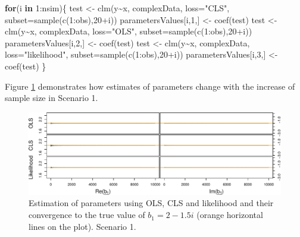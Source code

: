 \documentclass[
]{book}
\newenvironment{Shaded}{\begin{snugshade}}{\end{snugshade}}
\newcommand{\AttributeTok}[1]{\textcolor[rgb]{0.77,0.63,0.00}{#1}}
\newcommand{\ControlFlowTok}[1]{\textcolor[rgb]{0.13,0.29,0.53}{\textbf{#1}}}
\newcommand{\DecValTok}[1]{\textcolor[rgb]{0.00,0.00,0.81}{#1}}
\newcommand{\FunctionTok}[1]{\textcolor[rgb]{0.00,0.00,0.00}{#1}}
\newcommand{\NormalTok}[1]{#1}
\newcommand{\OtherTok}[1]{\textcolor[rgb]{0.56,0.35,0.01}{#1}}
\newcommand{\SpecialCharTok}[1]{\textcolor[rgb]{0.00,0.00,0.00}{#1}}
\newcommand{\StringTok}[1]{\textcolor[rgb]{0.31,0.60,0.02}{#1}}
\begin{document}
\begin{Shaded}
\begin{Highlighting}[]
\ControlFlowTok{for}\NormalTok{(i }\ControlFlowTok{in} \DecValTok{1}\SpecialCharTok{:}\NormalTok{nsim)\{}
\NormalTok{    test }\OtherTok{\textless{}{-}} \FunctionTok{clm}\NormalTok{(y}\SpecialCharTok{\textasciitilde{}}\NormalTok{x, complexData, }\AttributeTok{loss=}\StringTok{"CLS"}\NormalTok{,}
                \AttributeTok{subset=}\FunctionTok{sample}\NormalTok{(}\FunctionTok{c}\NormalTok{(}\DecValTok{1}\SpecialCharTok{:}\NormalTok{obs),}\DecValTok{20}\SpecialCharTok{+}\NormalTok{i))}
\NormalTok{    parametersValues[i,}\DecValTok{1}\NormalTok{,] }\OtherTok{\textless{}{-}} \FunctionTok{coef}\NormalTok{(test)}
\NormalTok{    test }\OtherTok{\textless{}{-}} \FunctionTok{clm}\NormalTok{(y}\SpecialCharTok{\textasciitilde{}}\NormalTok{x, complexData, }\AttributeTok{loss=}\StringTok{"OLS"}\NormalTok{,}
                \AttributeTok{subset=}\FunctionTok{sample}\NormalTok{(}\FunctionTok{c}\NormalTok{(}\DecValTok{1}\SpecialCharTok{:}\NormalTok{obs),}\DecValTok{20}\SpecialCharTok{+}\NormalTok{i))}
\NormalTok{    parametersValues[i,}\DecValTok{2}\NormalTok{,] }\OtherTok{\textless{}{-}} \FunctionTok{coef}\NormalTok{(test)}
\NormalTok{    test }\OtherTok{\textless{}{-}} \FunctionTok{clm}\NormalTok{(y}\SpecialCharTok{\textasciitilde{}}\NormalTok{x, complexData, }\AttributeTok{loss=}\StringTok{"likelihood"}\NormalTok{,}
                \AttributeTok{subset=}\FunctionTok{sample}\NormalTok{(}\FunctionTok{c}\NormalTok{(}\DecValTok{1}\SpecialCharTok{:}\NormalTok{obs),}\DecValTok{20}\SpecialCharTok{+}\NormalTok{i))}
\NormalTok{    parametersValues[i,}\DecValTok{3}\NormalTok{,] }\OtherTok{\textless{}{-}} \FunctionTok{coef}\NormalTok{(test)}
\NormalTok{\}}
\end{Highlighting}
\end{Shaded}

Figure \ref{fig:parametersUCDV} demonstrates how estimates of parameters change with the increase of sample size in Scenario 1.

\begin{figure}
\centering
\includegraphics{Svetunkov---Svetunkov---Complex-Dynamic-Models_files/figure-latex/parametersUCDV-1.pdf}
\caption{\label{fig:parametersUCDV}Estimation of parameters using OLS, CLS and likelihood and their convergence to the true value of \(b_1=2-1.5i\) (orange horizontal lines on the plot). Scenario 1.}
\end{figure}
\end{document}
